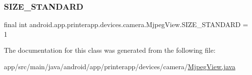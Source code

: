 \subsubsection{\texorpdfstring{S\+I\+Z\+E\+\_\+\+S\+T\+A\+N\+D\+A\+RD}{SIZE\_STANDARD}}
{\footnotesize\ttfamily final int android.\+app.\+printerapp.\+devices.\+camera.\+Mjpeg\+View.\+S\+I\+Z\+E\+\_\+\+S\+T\+A\+N\+D\+A\+RD = 1\hspace{0.3cm}{\ttfamily [static]}}



The documentation for this class was generated from the following file\+:\begin{DoxyCompactItemize}
\item 
app/src/main/java/android/app/printerapp/devices/camera/\hyperlink{_mjpeg_view_8java}{Mjpeg\+View.\+java}\end{DoxyCompactItemize}
